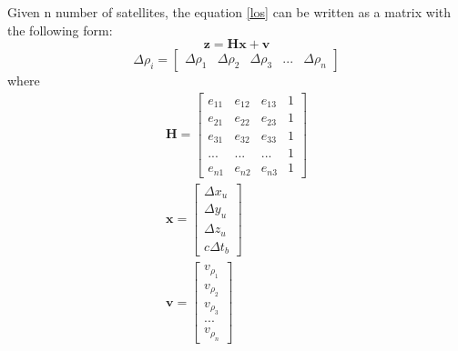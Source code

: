Given n number of satellites, the equation \eqref{los} can be written as a matrix with the following form:
\begin{equation}
   \textbf{z} = \textbf{Hx}+ \textbf{v}
\end{equation}
\begin{equation}
    \Delta \rho _i = \begin{bmatrix}
                        \Delta \rho_1 &  \Delta \rho_2 &  \Delta \rho_3 & ... & \Delta \rho_n
                     \end{bmatrix} 
\end{equation}
where 
\begin{subequations}
                \begin{align}
                    \textbf{H} = \begin{bmatrix}
                                   e_{11} & e_{12} & e_{13}& 1 \\
                                   e_{21} & e_{22} & e_{23}& 1 
                                   \\
                                   e_{31} & e_{32} & e_{33}& 1
                                   \\
                                   ... & ... & ... &  1 
                                   \\
                                   e_{n1} & e_{n2} & e_{n3} & 1
                                 \end{bmatrix}\\
                    \textbf{x} = \begin{bmatrix}
                                    \Delta x_u \\ \Delta y_u \\\Delta z_u \\ c\Delta t_b
                                 \end{bmatrix}\\
                    \textbf{v} = \begin{bmatrix}
                                v_{\rho_1}\\
                                v_{\rho_2}\\
                                v_{\rho_3}\\
                                ...\\
                                v_{\rho_n}
                             \end{bmatrix}
                 \end{align}
\end{subequations}

